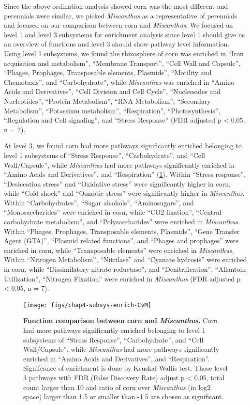 \documentclass[]{msu-thesis}
\begin{document}
Since the above ordination analysis showed corn was the most different
and perennials were similar, we picked \textit{Miscanthus} as a representative of
perennials and focused on our comparison between corn and \textit{Miscanthus}. We
focused on level 1 and level 3 subsystems for enrichment analysis since
level 1 should give us an overview of functions and level 3 should show
pathway level information. Using level 1 subsystems, we found the rhizosphere of corn was enriched in ``Iron acquisition and metabolism'', ``Membrane Transport'', ``Cell Wall and Capsule'', ``Phages, Prophages, Transposable elements, Plasmids'', ``Motility and Chemotaxis'', and ``Carbohydrate'', while \textit{Miscanthus} was enriched in ``Amino Acids and Derivatives'', ``Cell Division and Cell Cycle'', ``Nucleosides and Nucleotides'', ``Protein Metabolism'', ``RNA Metabolism'', ``Secondary Metabolism'', ``Potassium metabolism'', ``Respiration'', ``Photosynthesis'', ``Regulation and Cell signaling'', and ``Stress Response'' (FDR adjusted p < 0.05, n = 7).

At level 3, we found corn had more pathways significantly enriched belonging to level 1 subsystems of ``Stress Response'', ``Carbohydrate'', and ``Cell Wall/Capsule'', while \textit{Miscanthus} had more pathways significantly enriched in ``Amino Acids and Derivatives'', and ``Respiration'' (\cref{fig:chap4FigS5}). Within ``Stress response'', ``Desiccation stress'' and ``Oxidative stress'' were significantly higher in corn, while ``Cold shock'' and ``Osmotic stress'' were significantly higher in \textit{Miscanthus}. Within “Carbohydrates”, “Sugar alcohols”, ``Aminosugars'', and ``Monosaccharides'' were enriched in corn, while ``CO2 fixation'', ``Central carbohydrate metabolism'', and ``Polysaccharides'' were enriched in \textit{Miscanthus}. Within ``Phages, Prophages, Transposable elements, Plasmids'', ``Gene Transfer Agent (GTA)'', ``Plasmid related functions'', and ``Phages and prophages'' were enriched in corn, while ``Transposable elements'' were enriched in \textit{Miscanthus}. Within ``Nitrogen Metabolism'', ``Nitrilase'' and ``Cyanate hydrosis'' were enriched in corn, while ``Dissimilatory nitrate reductase'', and ``Denitrification'', ``Allantoin Utilization'', ``Nitrogen Fixation'' were enriched in \textit{Miscanthus} (FDR adjusted p < 0.05, n = 7).


\begin{figure}[tbph!]
  \centering
  \texttt{[image: figs/chap4-subsys-enrich-CvM]}
  \caption[Function comparison between corn and
  \textit{Miscanthus}]{\textbf{Function comparison between corn and
    \textit{Miscanthus}.} Corn had more pathways significantly enriched belonging to level 1 subsystems of ``Stress Response'', ``Carbohydrate'', and ``Cell Wall/Capsule'', while \textit{Miscanthus} had more pathways significantly enriched in ``Amino Acids and Derivatives'', and ``Respiration''. Signifcance of enrichment is done by Kruskal-Wallis test. Those level 3 pathways with FDR (False Discovery Rate) adjust p < 0.05, total count larger than 10 and ratio of corn over \textit{Miscanthus} (in log2 space) larger than 1.5  or smaller than -1.5 are chosen as significant.}
  \label{fig:chap4FigS5}
\end{figure}
\end{document}
